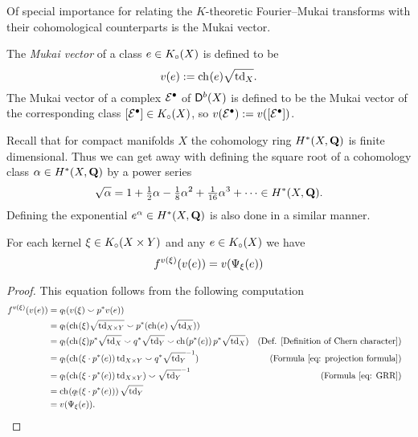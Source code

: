 Of special importance for relating the $K$-theoretic Fourier--Mukai transforms with their cohomological counterparts is the Mukai vector. 

\begin{definition}
    The \emph{Mukai vector} of a class $e \in K_{\circ}(X)$ is defined to be
    \[
        v(e) := \ch[](e)\sqrt{\tdclass{X}}.
    \]
    The Mukai vector of a complex $\mathcal E^\bullet$ of $\mathsf{D}^b(X)$ is defined to be the Mukai vector of the corresponding class $[\mathcal E^\bullet] \in K_{\circ}(X)$, so $v(\mathcal E^\bullet) := v([\mathcal E^\bullet])$.
\end{definition}

\begin{remark}
    \label{sqrt of cohomology class}
    Recall that for compact manifolds $X$ the cohomology ring $H^{*}(X, \mathbf Q)$ is finite dimensional. Thus we can get away with defining the square root of a cohomology class $\alpha \in H^{*}(X, \mathbf Q)$ by a power series
    \[
        \sqrt{\alpha} = 1 + \tfrac{1}{2}\alpha - \tfrac{1}{8}\alpha^2 + \tfrac{1}{16}\alpha^3 + \cdots \in H^{*}(X, \mathbf Q).
    \]
    Defining the exponential $e^\alpha \in H^{*}(X, \mathbf Q)$ is also done in a similar manner. 
\end{remark}

\begin{proposition}
    \label{Mukai vector FM transform interaction}
    For each kernel $\xi \in K_{\circ}(X \times Y)$ and any $e \in K_{\circ}(X)$ we have
    \[
        f^{v(\xi)}(v(e)) = v(\Psi_{\xi}(e))
    \]  
\end{proposition}

\begin{proof}
    This equation follows from the following computation
    \begin{align*}
        \fmcoh{v(\xi)}(v(e)) &=
        q_!(v(\xi) \smallsmile p^*v(e)) \\
        &= q_!(\ch[](\xi)\sqrt{\tdclass{X \times Y}} \smallsmile p^*(\ch[]{e}\sqrt{\tdclass{X}})) \\
        &= q_!(\ch[](\xi)p^*\sqrt{\tdclass{X}} \smallsmile q^*\sqrt{\tdclass{Y}} \smallsmile \ch[]{p^*(e)}p^*\sqrt{\tdclass{X}}) & \text{(Def. \ref{Definition of Chern character})} \\
        &= q_!(\ch[](\xi \cdot p^*(e))\tdclass{X \times Y} \smallsmile q^*\sqrt{\tdclass{Y}}\inv) & \text{(Formula \eqref{eq: projection formula})}\\
        &= q_!(\ch[](\xi \cdot p^*(e))\tdclass{X \times Y}) \smallsmile \sqrt{\tdclass{Y}}\inv & \text{(Formula \eqref{eq: GRR})} \\
        &= \ch[]{q_!(\xi \cdot p^*(e))}\sqrt{\tdclass{Y}} \\
        &= v(\fmkt{\xi}(e)). & & \qedhere
    \end{align*}
\end{proof}

